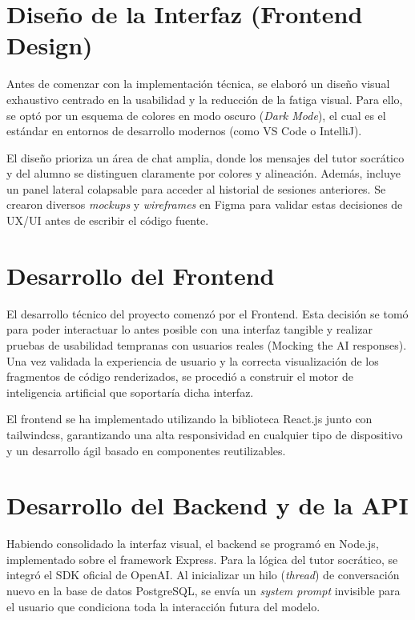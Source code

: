 \section{Diseño de la Interfaz (Frontend Design)}
Antes de comenzar con la implementación técnica, se elaboró un diseño visual exhaustivo centrado en la usabilidad y la reducción de la fatiga visual. Para ello, se optó por un esquema de colores en modo oscuro (\textit{Dark Mode}), el cual es el estándar en entornos de desarrollo modernos (como VS Code o IntelliJ).

El diseño prioriza un área de chat amplia, donde los mensajes del tutor socrático y del alumno se distinguen claramente por colores y alineación. Además, incluye un panel lateral colapsable para acceder al historial de sesiones anteriores. Se crearon diversos \textit{mockups} y \textit{wireframes} en Figma para validar estas decisiones de UX/UI antes de escribir el código fuente.

\section{Desarrollo del Frontend}
El desarrollo técnico del proyecto comenzó por el Frontend. Esta decisión se tomó para poder interactuar lo antes posible con una interfaz tangible y realizar pruebas de usabilidad tempranas con usuarios reales (Mocking the AI responses). Una vez validada la experiencia de usuario y la correcta visualización de los fragmentos de código renderizados, se procedió a construir el motor de inteligencia artificial que soportaría dicha interfaz.

El frontend se ha implementado utilizando la biblioteca React.js junto con tailwindcss, garantizando una alta responsividad en cualquier tipo de dispositivo y un desarrollo ágil basado en componentes reutilizables.

\section{Desarrollo del Backend y de la API}
Habiendo consolidado la interfaz visual, el backend se programó en Node.js, implementado sobre el framework Express. Para la lógica del tutor socrático, se integró el SDK oficial de OpenAI. Al inicializar un hilo (\textit{thread}) de conversación nuevo en la base de datos PostgreSQL, se envía un \textit{system prompt} invisible para el usuario que condiciona toda la interacción futura del modelo.

